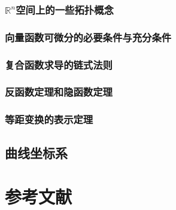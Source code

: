\documentclass[zihao=-4,linespread=1.5,a4paper,heading=true,twoside]{ctexbook}
\theoremstyle{definition}
\theoremstyle{plain}
\begin{document}
\section{$\mathbb{R}^n$空间上的一些拓扑概念}\label{sec:B.1}


\section{向量函数可微分的必要条件与充分条件}\label{sec:B.2}


\section{复合函数求导的链式法则}\label{sec:B.3}


\section{反函数定理和隐函数定理}\label{sec:B.4}


\section{等距变换的表示定理}\label{sec:B.5}


\chapter{曲线坐标系}\label{sec:C}


\newpage\part*{参考文献}
\printbibliography[heading=none]
\end{document}
